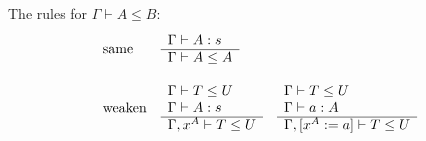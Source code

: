 The rules for $\Gamma \vdash A \le B$:
$$
\begin{array}{lllll} 
    \text{same} &
    \begin{array}{l} 
        \Gamma \vdash A: s
     \\ \hline 
        \Gamma \vdash A \le A
     \end{array}
    \\
    \\
    \text{weaken} &
    \begin{array}{l} 
        \Gamma \vdash T \le U
        \\
        \Gamma \vdash A : s
     \\ \hline 
        \Gamma, x^A \vdash T \le U
     \end{array}
    \quad
    \begin{array}{l} 
        \Gamma \vdash T \le U
        \\
        \Gamma \vdash a: A
     \\ \hline 
        \Gamma, [x^A := a] \vdash T \le U
     \end{array}
 \end{array}
$$
